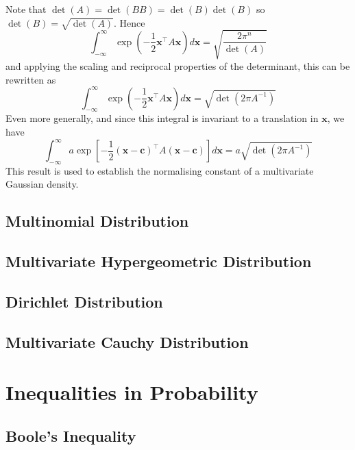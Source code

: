 \documentclass[11pt]{report} %
\begin{document}
Note that $\det\left(A\right) = \det\left(BB\right) = \det\left(B\right)\det\left(B\right)$ so $\det\left(B\right) = \sqrt{\det\left(A\right)}$. Hence
\begin{equation}
\int_{-\infty}^{\infty}\exp\left(-\dfrac{1}{2}\mathbf{x}^{\top}A\mathbf{x}\right)d\mathbf{x} = \sqrt{\dfrac{2\pi^{n}}{\det\left(A\right)}}
\end{equation}
and applying the scaling and reciprocal properties of the determinant, this can be rewritten as
\begin{equation}
\int_{-\infty}^{\infty}\exp\left(-\dfrac{1}{2}\mathbf{x}^{\top}A\mathbf{x}\right)d\mathbf{x} = \sqrt{\det \left(2\pi A^{-1}\right)}
\end{equation}
Even more generally, and since this integral is invariant to a translation in $\mathbf{x}$, we have
\begin{equation}
\int_{-\infty}^{\infty}a\exp\left[-\dfrac{1}{2}\left(\mathbf{x} - \mathbf{c}\right)^{\top}A\left(\mathbf{x} - \mathbf{c}\right)\right]d\mathbf{x} = a\sqrt{\det \left(2\pi A^{-1}\right)}
\end{equation}
This result is used to establish the normalising constant of a multivariate Gaussian density.

\subsection{Multinomial Distribution}

\subsection{Multivariate Hypergeometric Distribution}

\subsection{Dirichlet Distribution}

\subsection{Multivariate Cauchy Distribution} 

\section{Inequalities in Probability}

\subsection{Boole's Inequality}
\end{document}
